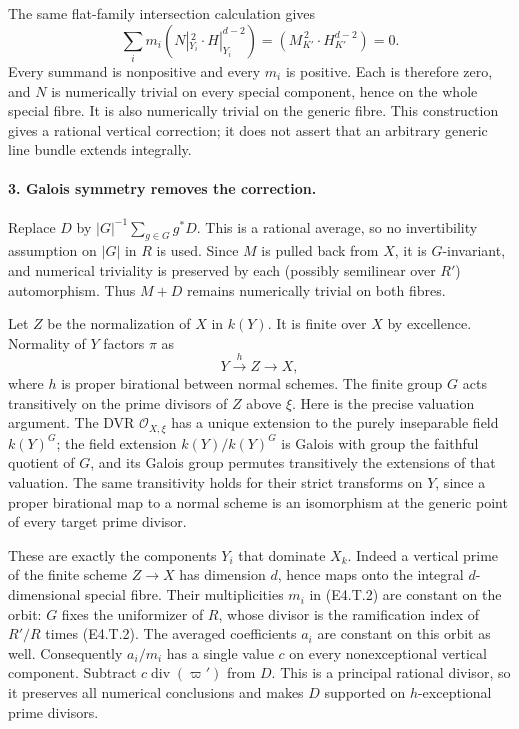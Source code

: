 The same flat-family intersection calculation gives
\[
 \sum_i m_i(N|_{Y_i}^{\,2}\cdot H|_{Y_i}^{d-2})
       =(M_{K'}^{\,2}\cdot H_{K'}^{d-2})=0.              \tag{E4.T.7}
\]
Every summand is nonpositive and every $m_i$ is positive. Each is therefore
zero, and $N$ is numerically trivial on every special component, hence
on the whole special fibre. It is also numerically trivial on the generic
fibre. This construction gives a rational vertical correction; it does
not assert that an arbitrary generic line bundle extends integrally.

\paragraph{3. Galois symmetry removes the correction.}
Replace $D$ by $|G|^{-1}\sum_{g\in G}g^*D$. This is a rational average,
so no invertibility assumption on $|G|$ in $R$ is used. Since $M$ is pulled
back from $X$, it is $G$-invariant, and numerical triviality is preserved
by each (possibly semilinear over $R'$) automorphism. Thus $M+D$ remains
numerically trivial on both fibres.

Let $Z$ be the normalization of $X$ in $k(Y)$. It is finite over $X$ by
excellence. Normality of $Y$ factors $\pi$ as
\[
 Y\xrightarrow{h}Z\longrightarrow X,
\]
where $h$ is proper birational between normal schemes. The finite group
$G$ acts transitively on the prime divisors of $Z$ above $\xi$.
Here is the precise valuation argument. The DVR $\mathcal O_{X,\xi}$ has
a unique extension to the purely inseparable field $k(Y)^G$; the field
extension $k(Y)/k(Y)^G$ is Galois with group the faithful quotient of $G$,
and its Galois group permutes transitively the extensions of that valuation.
The same transitivity holds for their strict transforms on $Y$, since
a proper birational map to a normal scheme is an isomorphism at the
generic point of every target prime divisor.

These are exactly the components $Y_i$ that dominate $X_k$. Indeed a
vertical prime of the finite scheme $Z\to X$ has dimension $d$, hence
maps onto the integral $d$-dimensional special fibre. Their multiplicities
$m_i$ in (E4.T.2) are constant on the orbit: $G$ fixes the uniformizer of
$R$, whose divisor is the ramification index of $R'/R$ times (E4.T.2).
The averaged coefficients $a_i$ are constant on this orbit as well.
Consequently $a_i/m_i$ has a single value $c$ on every nonexceptional
vertical component. Subtract $c\operatorname{div}(\varpi')$ from $D$.
This is a principal rational divisor, so it preserves all numerical
conclusions and makes $D$ supported on $h$-exceptional prime divisors.

